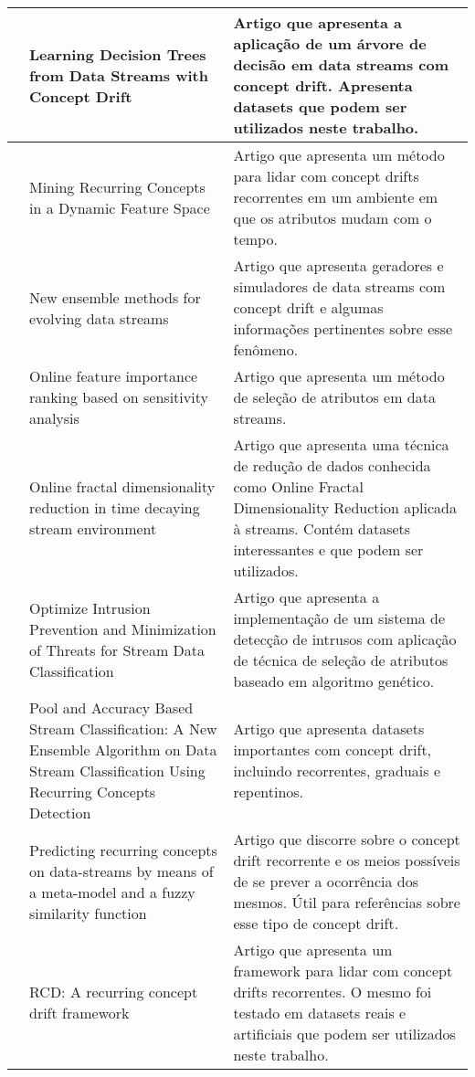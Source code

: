 \begin{longtable}[c]{|p{2.7cm}|p{5cm}|p{7cm}|}
\\ \hline
\cite{Jankowski2016} & Learning Decision Trees from Data Streams with Concept Drift & Artigo que apresenta a aplicação de um árvore de decisão em data streams com concept drift. Apresenta datasets que podem ser utilizados neste trabalho.
\\ \hline
\cite{Gomes2014} & Mining Recurring Concepts in a Dynamic Feature Space & Artigo que apresenta um método para lidar com concept drifts recorrentes em um ambiente em que os atributos mudam com o tempo.
\\ \hline
\cite{Bifet2009} & New ensemble methods for evolving data streams & Artigo que apresenta geradores e simuladores de data streams com concept drift e algumas informações pertinentes sobre esse fenômeno.
\\ \hline
\cite{Razmjoo2017} & Online feature importance ranking based on sensitivity analysis & Artigo que apresenta um método de seleção de atributos em data streams.
\\ \hline
\cite{Chen2011} & Online fractal dimensionality reduction in time decaying stream environment & Artigo que apresenta uma técnica de redução de dados conhecida como Online Fractal Dimensionality Reduction aplicada à streams. Contém datasets interessantes e que podem ser utilizados.
\\ \hline
\cite{Rajput2014} & Optimize Intrusion Prevention and Minimization of Threats for Stream Data Classification & Artigo que apresenta a implementação de um sistema de detecção de intrusos com aplicação de técnica de seleção de atributos baseado em algoritmo genético.
\\ \hline
\cite{Hosseini2011} & Pool and Accuracy Based Stream Classification: A New Ensemble Algorithm on Data Stream Classification Using Recurring Concepts Detection & Artigo que apresenta datasets importantes com concept drift, incluindo recorrentes, graduais e repentinos.
\\ \hline
\cite{MiguelAngel2016} & Predicting recurring concepts on data-streams by means of a meta-model and a fuzzy similarity function & Artigo que discorre sobre o concept drift recorrente e os meios possíveis de se prever a ocorrência dos mesmos. Útil para referências sobre esse tipo de concept drift.
\\ \hline
\cite{GoncalvesJr2013} & RCD: A recurring concept drift framework & Artigo que apresenta um framework para lidar com concept drifts recorrentes. O mesmo foi testado em datasets reais e artificiais que podem ser utilizados neste trabalho.

\end{longtable}
